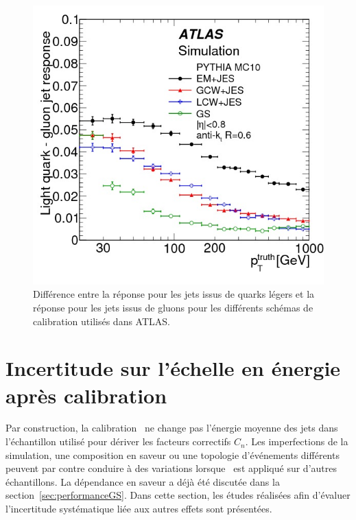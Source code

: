 
\begin{figure}[!h]
	\centering
	\includegraphics[scale=0.35]{figures/fig_78a.jpg}
	\caption{Diff\'erence entre la r\'eponse pour les jets issus de quarks l\'egers et la r\'eponse pour les jets issus de gluons pour les diff\'erents sch\'emas de calibration utilis\'es dans ATLAS.}
	\label{fig:fig_78a}
\end{figure}


\section{Incertitude sur l'\'echelle en \'energie apr\`es calibration~\GS}
\label{sec:systUncertGS}

Par construction, la calibration \GS~ne change pas l'\'energie moyenne des jets dans l'\'echantillon utilis\'e pour d\'eriver les facteurs correctifs $C_n$. Les imperfections de la simulation, une composition en saveur ou une topologie d'\'ev\'enements diff\'erents peuvent par contre conduire \`a des variations lorsque \GS~est appliqu\'e sur d'autres \'echantillons. La d\'ependance en saveur a d\'ej\`a \'et\'e discut\'ee dans la section~\ref{sec:performanceGS}. Dans cette section, les \'etudes r\'ealis\'ees afin d'\'evaluer l'incertitude syst\'ematique li\'ee aux autres effets sont pr\'esent\'ees.


